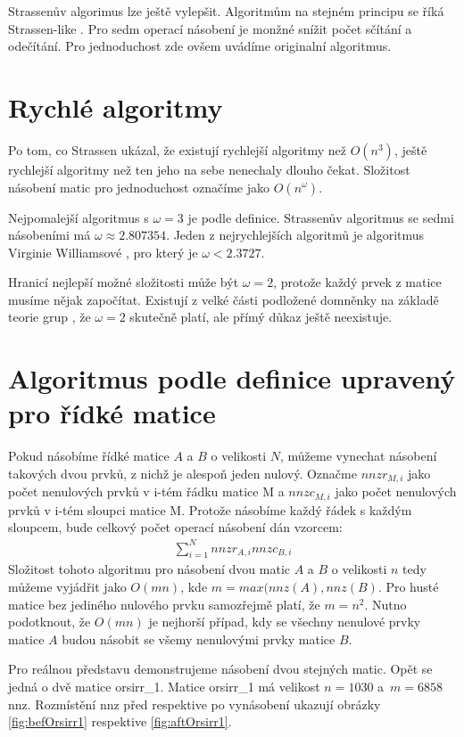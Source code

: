 Strassenův algorimus lze ještě vylepšit. Algoritmům na stejném principu se říká Strassen-like \cite{DBLP:journals/iacr/CenkH13}. Pro sedm operací násobení je monžné snížit počet sčítání a odečítání. Pro jednoduchost zde ovšem uvádíme originalní algoritmus.

\section{Rychlé algoritmy}

Po tom, co Strassen ukázal, že existují rychlejší algoritmy než $O(n^3)$, ještě rychlejší algoritmy než ten jeho na sebe nenechaly dlouho čekat. Složitost násobení matic pro jednoduchost označíme jako $O(n^\omega)$.

Nejpomalejší algoritmus s $\omega=3$ je podle definice. Strassenův algoritmus se sedmi násobeními má $\omega\approx2.807354$. Jeden z nejrychlejších algoritmů je algoritmus Virginie Williamsové \cite{DBLP:conf/stoc/Williams12}\cite{BreakigCWB}, pro který je $\omega<2.3727$. 

Hranicí nejlepší možné složitosti může být $\omega=2$, protože každý prvek z matice musíme nějak započítat. Existují z velké části podložené domněnky na základě teorie grup \cite{complexityMM}, že $\omega=2$ skutečně platí, ale přímý důkaz ještě neexistuje.

\section{Algoritmus podle definice upravený pro řídké matice}

Pokud násobíme řídké matice $A$ a $B$ o velikosti $N$, můžeme vynechat násobení takových dvou prvků, z nichž je alespoň jeden nulový. Označme $nnzr_{M,i}$ jako počet nenulových prvků v i-tém řádku matice M a $nnzc_{M,i}$ jako počet nenulových prvků v i-tém sloupci matice M. Protože násobíme každý řádek s každým sloupcem, bude celkový počet operací násobení dán vzorcem:
\begin{align}
\sum_{i=1}^{N} nnzr_{A,i} nnzc_{B,i}
\end{align}
Složitost tohoto algoritmu pro násobení dvou matic $A$ a $B$ o velikosti $n$ tedy můžeme vyjádřit jako $O(mn)$, kde $m = max(nnz(A),nnz(B)$. Pro husté matice bez jediného nulového prvku samozřejmě platí, že $m=n^2$. Nutno podotknout, že $O(mn)$ je nejhorší případ, kdy se všechny nenulové prvky matice $A$ budou násobit se všemy nenulovými prvky matice $B$.

Pro reálnou představu demonstrujeme násobení dvou stejných matic. Opět se jedná o dvě matice orsirr\_1. Matice orsirr\_1 má velikost $n=1030$ a~$m=6858$ nnz. Rozmístění nnz před respektive po vynásobení ukazují obrázky \ref{fig:befOrsirr1} respektive \ref{fig:aftOrsirr1}.


